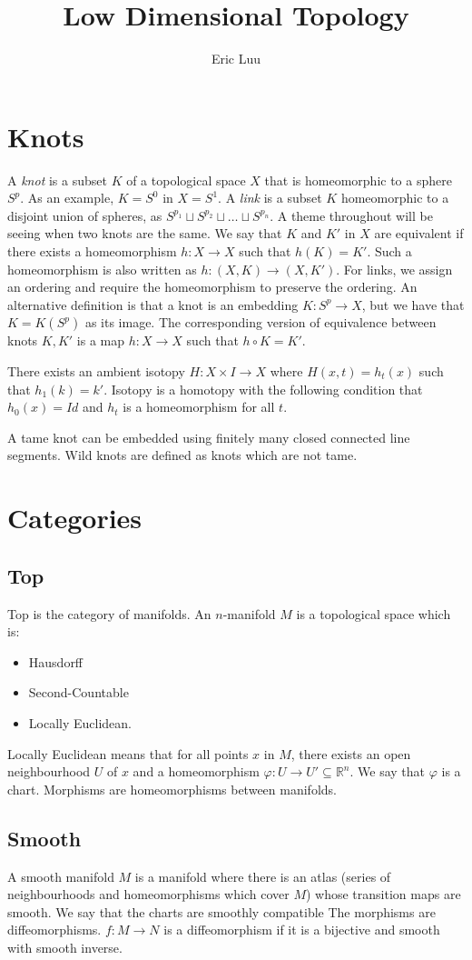 \documentclass{article}
\title{Low Dimensional Topology}
\author{Eric Luu}
\theoremstyle{definition}
\numberwithin{theorem}{section}
\numberwithin{equation}{section}
\begin{document}
\section{Knots}
A \textit{knot} is a subset $K$ of a topological space $X$ that is homeomorphic to a sphere $S^p$. As an example, $K = S^0$ in $X = S^1$. A \textit{link} is a subset $K$ homeomorphic to a disjoint union of spheres, as $S^{p_1} \sqcup  S^{p_2} \sqcup \ldots \sqcup S^{p_n}$. A theme throughout will be seeing when two knots are the same. We say that $K$ and $K'$ in $X$ are equivalent if there exists a homeomorphism $h : X \rightarrow X$ such that $h(K) = K'$. 
Such a homeomorphism is also written as $h : (X, K) \rightarrow (X, K')$. For links, we assign an ordering and require the homeomorphism to preserve the ordering. 
An alternative definition is that a knot is an embedding $K: S^p \rightarrow X$, but we have that $K = K(S^p)$ as its image. The corresponding version of equivalence between knots $K, K'$ is a map $h: X \rightarrow X$ such that $h \circ K = K'$. 

There exists an ambient isotopy $H : X \times I \rightarrow X$ where $H(x, t) = h_t(x)$ such that $h_1(k) = k'$. Isotopy is a homotopy with the following condition that $h_0(x) = Id$ and $h_t$ is a homeomorphism for all $t$. 

A tame knot can be embedded using finitely many closed connected line segments. Wild knots are defined as knots which are not tame. 

\section{Categories}
\subsection{Top}
Top is the category of manifolds. An $n$-manifold $M$ is a topological space which is:
\begin{itemize}
    \item Hausdorff
    \item Second-Countable
    \item Locally Euclidean.
\end{itemize}
Locally Euclidean means that for all points $x$ in $M$, there exists an open neighbourhood $U$ of $x$ and a homeomorphism $\varphi:U \rightarrow U' \subseteq \mathbb{R}^n$. We say that $\varphi$ is a chart. Morphisms are homeomorphisms between manifolds. 

\subsection{Smooth}
A smooth manifold $M$ is a manifold where there is an atlas (series of neighbourhoods and homeomorphisms which cover $M$) whose transition maps are smooth. We say that the charts are smoothly compatible The morphisms are diffeomorphisms. 
$f: M \rightarrow N$ is a diffeomorphism if it is a bijective and smooth with smooth inverse. 
\end{document}
